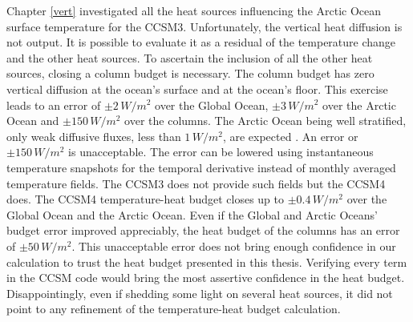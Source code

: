Chapter \ref{vert} investigated all the heat sources influencing the Arctic Ocean surface temperature for the CCSM3. Unfortunately, the vertical heat diffusion is not output. It is possible to evaluate it as a residual of the temperature change and the other heat sources. To ascertain the inclusion of all the other heat sources, closing a column budget is necessary. The column budget has zero vertical diffusion at the ocean's surface and at the ocean's floor. This exercise leads to an error of $\pm 2\,W/m^2$ over the Global Ocean, $\pm 3\,W/m^2$ over the Arctic Ocean and $\pm 150\,W/m^2$ over the columns. The Arctic Ocean being well stratified, only weak diffusive fluxes, less than $1\,W/m^2$, are expected \citep{Timmermans:2008fk}. An error or $\pm 150\,W/m^2$ is unacceptable. The error can be lowered using instantaneous temperature snapshots for the temporal derivative instead of monthly averaged temperature fields. The CCSM3 does not provide such fields but the CCSM4 does. The CCSM4 temperature-heat budget closes up to $\pm 0.4\,W/m^2$ over the Global Ocean and the Arctic Ocean. Even if the Global and Arctic Oceans' budget error improved appreciably, the heat budget of the columns has an error of $\pm 50\,W/m^2$. This unacceptable error does not bring enough confidence in our calculation to trust the heat budget presented in this thesis. Verifying every term in the CCSM code would bring the most assertive confidence in the heat budget. Disappointingly, even if shedding some light on several heat sources, it did not point to any refinement of the temperature-heat budget calculation.

